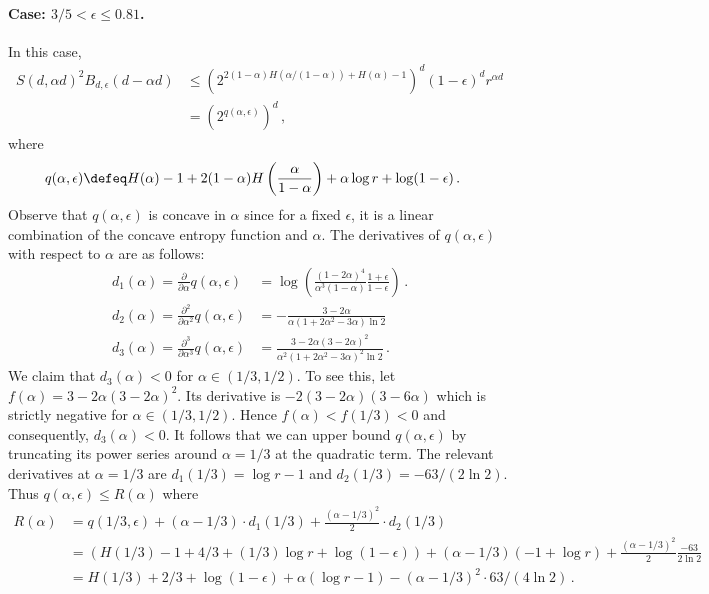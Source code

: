   \paragraph{Case: $3/5 < \epsilon \leq 0.81$.}
  In this case, 
  \begin{align*}
  S(d,\alpha d)^2 B_{d,\epsilon}(d-\alpha d)
  &\leq \left( 2^{2(1-\alpha)H(\alpha/(1-\alpha)) + H(\alpha) - 1} \right)^d (1-\epsilon)^d 
   r^{\alpha d} \\
  &=\left( 2^{q(\alpha, \epsilon)} \right)^d\, ,
  \end{align*}
  where
  \begin{align*}
  q(\alpha, \epsilon)
  &\defeq H(\alpha) - 1 + 2(1-\alpha) H\left(\frac{\alpha}{1-\alpha}\right) 
  + \alpha \log r +\log(1-\epsilon)\,.
  \end{align*}
  Observe that $q(\alpha, \epsilon)$ is concave in $\alpha$ since for a fixed $\epsilon$, it is a linear combination of the concave entropy function and $\alpha$.  
  The derivatives of $q(\alpha, \epsilon)$ with respect to $\alpha$ are as follows:
  \begin{align*}
  d_1(\alpha) = \frac{\partial}{\partial \alpha}q(\alpha, \epsilon)
   &= \log \left(\frac{(1-2\alpha)^4}{\alpha^3(1-\alpha)}  \frac{1+\epsilon}{1-\epsilon} \right)\, .\\
  d_2(\alpha) = \frac{\partial^2}{\partial \alpha^2}q(\alpha, \epsilon)
  &= -\frac{3-2\alpha}{\alpha(1+2\alpha^2 -3\alpha) \ln 2} \\
  d_3(\alpha) = \frac{\partial^3}{\partial \alpha^3}q(\alpha, \epsilon)
  &= \frac{3-2\alpha( 3-2\alpha)^2}{\alpha^2(1+2\alpha^2 -3\alpha)^2 \ln 2}
  \, .
  \end{align*}
  We claim that $d_3(\alpha) < 0$ for $\alpha \in (1/3, 1/2)$. 
  To see this, let $f(\alpha) = 3 - 2\alpha(3 - 2\alpha)^2$. 
  Its derivative is $-2(3 - 2\alpha)(3 - 6\alpha)$ which is strictly negative for $\alpha \in (1/3, 1/2)$. 
  Hence $f(\alpha) < f(1/3) < 0$ and consequently, $d_3(\alpha) < 0$. 
  It follows that we can upper bound $q(\alpha, \epsilon)$ 
  by truncating its power series around $\alpha = 1/3$ 
  at the quadratic term. 
  The relevant derivatives at $\alpha = 1/3$ are 
  $d_1(1/3) = \log r - 1$ and
  $d_2(1/3) = -63/(2 \ln 2)$. 
  Thus $q(\alpha, \epsilon) \leq R(\alpha)$ where
  \begin{align*}
  R(\alpha)
  &= q(1/3, \epsilon) + (\alpha-1/3)\cdot d_1(1/3) + \frac{(\alpha-1/3)^2}{2}\cdot d_2(1/3) \\
  &= \left( H(1/3) - 1 + 4/3
      + (1/3)\log r + \log(1-\epsilon) \right)
      + (\alpha-1/3) \left( -1 + \log r \right)
      + \frac{(\alpha-1/3)^2}{2} \frac{-63}{2\ln 2}
  \\
  &= H(1/3) + 2/3 + \log(1-\epsilon) 
      + \alpha (\log r - 1) 
      - (\alpha-1/3)^2 \cdot 63/(4\ln 2)
      \,.
  \end{align*}
